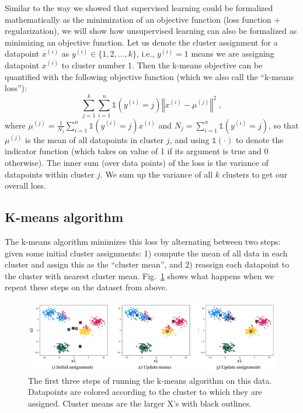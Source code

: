 Similar to the way we showed that supervised learning could be
formalized mathematically as the minimization of an objective function
(loss function + regularization), we will show how unsupervised
learning can also be formalized as minimizing an objective function.
Let us denote the cluster assignment for a datapoint $x^{(i)}$ as
$y^{(i)} \in \{1,2,\ldots,k\}$, i.e., $y^{(i)} = 1$ means we are
assigning datapoint $x^{(i)}$ to cluster number 1. Then the k-means
objective can be quantified with the following objective function
(which we also call the ``k-means loss''):
\begin{equation}
  \sum_{j=1}^k \sum_{i=1}^n \mathbb{1}(y^{(i)} = j) \left\Vert x^{(i)} - \mu^{(j)} \right\Vert^2 \label{eqn:kmeans_obj} \;,
\end{equation}
where $\mu^{(j)} = \frac{1}{N_j} \sum_{i=1}^n \mathbb{1}(y^{(i)} = j) x^{(i)}$
and $N_j = \sum_{i=1}^n \mathbb{1}(y^{(i)} = j)$, so that $\mu^{(j)}$ is the
mean of all datapoints in cluster $j$, and using $\mathbb{1}(\cdot)$
to denote the indicator function (which takes on value of 1 if its argument
is true and 0 otherwise). The inner sum (over data points) of the loss is
the variance of datapoints within cluster $j$. We sum up the variance
of all $k$ clusters to get our overall loss.

\subsection{K-means algorithm}

The k-means algorithm minimizes this loss by alternating between two
steps: given some initial cluster assignments: 1) compute the mean of
all data in each cluster and assign this as the ``cluster mean'', and 2)
reassign each datapoint to the cluster with nearest cluster
mean. Fig.~\ref{fig:kmeans_iters} shows what happens when we repeat
these steps on the dataset from above.

\begin{figure}[h]
  \centering
  \includegraphics[width=1.0\textwidth]{figures/kmeans_iters.png}
  \caption{The first three steps of running the k-means algorithm on
    this data. Datapoints are colored according to the cluster to
    which they are assigned. Cluster means are the larger X's with
    black outlines.}
  \label{fig:kmeans_iters}
\end{figure}

